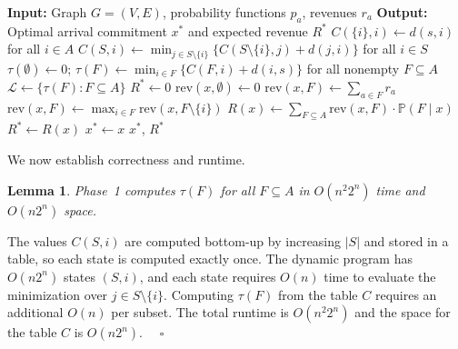 \documentclass[11pt]{article}
\theoremstyle{plain}
\newtheorem{lemma}[theorem]{Lemma}
\theoremstyle{definition}
\renewenvironment{proof}[1]{\par\noindent{\itshape #1}\space\ignorespaces}{\par\medskip}
\newcommand{\Halmos}{\ensuremath{\quad\square}}
\newcommand{\SingleSpacedXII}{}
\begin{document}
	\begin{algorithm}[htbp]
		\SingleSpacedXII
		\caption{Brute-force algorithm for the \ac{TSPSC}}
		\label{alg:bruteForce}
		\begin{algorithmic}[1]
			\State \textbf{Input:} Graph $G = (V, E)$, probability functions $p_a$, revenues $r_a$
			\State \textbf{Output:} Optimal arrival commitment $x^*$ and expected revenue $R^*$
			\Statex
			\State $C(\{i\}, i) \gets d(s, i)$ for all $i \in A$ \label{line:bf:hk_start} 
			\State $C(S, i) \gets \min_{j \in S \setminus \{i\}} \{ C(S \setminus \{i\}, j) + d(j, i) \}$ for all $i \in S$
			\EndFor
			\State $\tau(\emptyset) \gets 0$; $\tau(F) \gets \min_{i \in F} \{C(F, i) + d(i, s)\}$ for all nonempty $F \subseteq A$ 
			\State $\mathcal{L} \gets \{\tau(F) : F \subseteq A\}$ \label{line:bf:hk_end} 
			\Statex
			\State $R^* \gets 0$ \label{line:bf:eval_start}
			\State $\text{rev}(x, \emptyset) \gets 0$ \label{line:bf:dp_start}
			\State $\text{rev}(x, F) \gets \sum_{a \in F} r_a$ 
			\Else
			\State $\text{rev}(x, F) \gets \max_{i \in F} \text{rev}(x, F \setminus \{i\})$ 
			\EndIf
			\EndFor \label{line:bf:dp_end}
			\State $R(x) \gets \sum_{F \subseteq A} \text{rev}(x, F) \cdot \mathbb{P}(F \mid x)$ \label{line:bf:exp_rev} 
			\State $R^* \gets R(x)$
			\State $x^* \gets x$
			\EndIf
			\EndFor \label{line:bf:eval_end}
			\Statex
			\State \Return $x^*$, $R^*$
		\end{algorithmic}
	\end{algorithm}
	
	We now establish correctness and runtime.
	
	\begin{lemma}\label{lemma:naiveComputationLengths}
		Phase~1 computes $\tau(F)$ for all $F \subseteq A$ in $O(n^2 2^n)$ time and $O(n 2^n)$ space.
	\end{lemma}
	\begin{proof}{Proof.}
		The values $C(S, i)$ are computed bottom-up by increasing $|S|$ and stored 
		in a table, so each state is computed exactly once.
		The dynamic program has $O(n 2^n)$ states $(S, i)$, and each state requires $O(n)$ time to evaluate the minimization over $j \in S \setminus \{i\}$. Computing $\tau(F)$ from the table $C$ requires an additional $O(n)$ per subset. The total runtime is $O(n^2 2^n)$ and the space for the table $C$ is $O(n 2^n)$.
	\Halmos
\end{proof}
	
\end{document}
